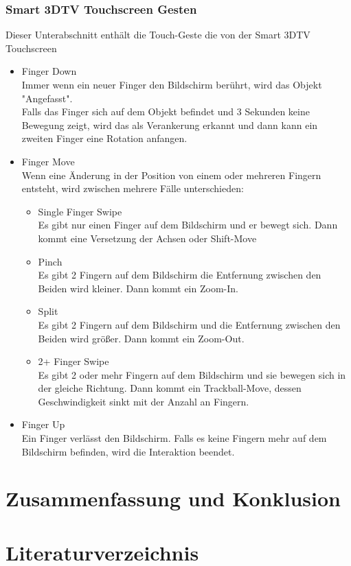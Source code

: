 \documentclass[12pt]{extarticle}
\begin{document}
\subsubsection{Smart 3DTV Touchscreen Gesten}
Dieser Unterabschnitt enthält die Touch-Geste die von der Smart 3DTV Touchscreen
\begin{itemize}
\item Finger Down\\
Immer wenn ein neuer Finger den Bildschirm berührt, wird das Objekt "Angefasst". \\

Falls das Finger sich auf dem Objekt befindet und 3 Sekunden keine Bewegung zeigt, wird das als Verankerung erkannt und dann kann ein zweiten Finger eine Rotation anfangen.

\item Finger Move\\
Wenn eine Änderung in der Position von einem oder mehreren Fingern entsteht, wird zwischen mehrere Fälle unterschieden:
\begin{itemize}
\item Single Finger Swipe\\
Es gibt nur einen Finger auf dem Bildschirm und er bewegt sich. Dann kommt eine Versetzung der Achsen oder Shift-Move
\item Pinch\\
Es gibt 2 Fingern auf dem Bildschirm die Entfernung zwischen den Beiden wird kleiner. Dann kommt ein Zoom-In.
\item Split\\
Es gibt 2 Fingern auf dem Bildschirm und die Entfernung zwischen den Beiden wird größer. Dann kommt ein Zoom-Out.
\item 2+ Finger Swipe\\
Es gibt 2 oder mehr Fingern auf dem Bildschirm und sie bewegen sich in der gleiche Richtung. Dann kommt ein Trackball-Move, dessen Geschwindigkeit sinkt mit der Anzahl an Fingern.
\end{itemize}

\item Finger Up\\
Ein Finger verlässt den Bildschirm. Falls es keine Fingern mehr auf dem Bildschirm befinden, wird die Interaktion beendet.
\end{itemize}

\section {Zusammenfassung und Konklusion}
\section*{Literaturverzeichnis}


\end{document}
